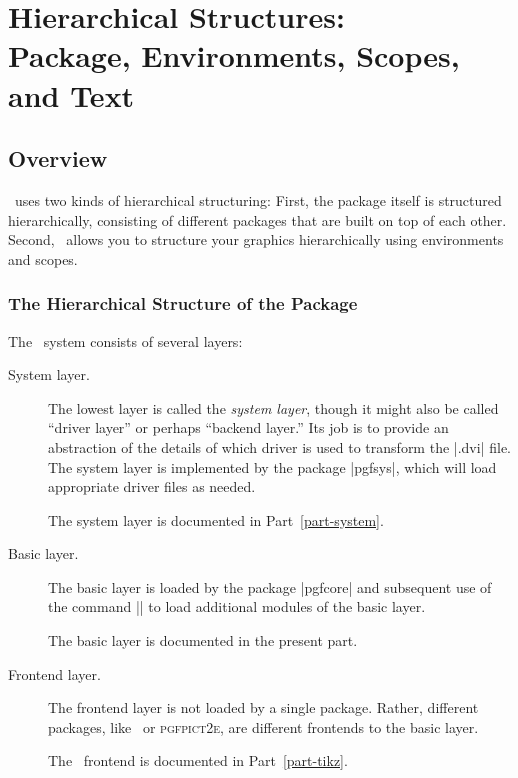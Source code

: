 %
%
%


\section[Hierarchical Structures: Package, Environments, Scopes, and Text]
{Hierarchical Structures:\\
  Package, Environments, Scopes, and Text}


\subsection{Overview}

\pgfname\ uses two kinds of hierarchical structuring: First, the
package itself is structured hierarchically, consisting of different
packages that are built on top of each other. Second, \pgfname\ allows you
to structure your graphics hierarchically using environments and scopes.

\subsubsection{The  Hierarchical Structure of the Package}

The \pgfname\ system consists of several layers:

\begin{description}
\item[System layer.]
  The lowest layer is called the \emph{system layer}, though it might
  also be called ``driver layer'' or perhaps ``backend layer.'' Its
  job is to provide an abstraction of the details of which driver
  is used to transform the |.dvi| file. The system layer is
  implemented by the package |pgfsys|, which will load appropriate
  driver files as needed.

  The system layer is documented in Part~\ref{part-system}.
\item[Basic layer.]
  The basic layer is loaded by the package |pgfcore| and subsequent
  use of the command |\usepgfmodule| to load additional modules of the
  basic layer.

  The basic layer is documented in the present part.
\item[Frontend layer.]
  The frontend layer is not loaded by a single package. Rather,
  different packages, like \tikzname\ or \textsc{pgfpict2e}, are
  different frontends to the basic layer.

  The \tikzname\ frontend is documented in Part~\ref{part-tikz}.
\end{description}

